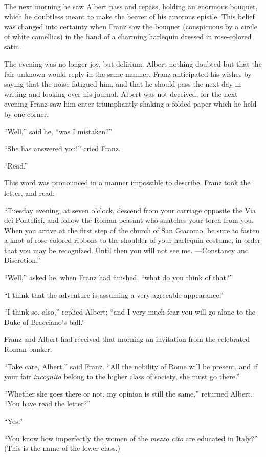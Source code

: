 The next morning he saw Albert pass and repass, holding an enormous
bouquet, which he doubtless meant to make the bearer of his amorous
epistle. This belief was changed into certainty when Franz saw the
bouquet (conspicuous by a circle of white camellias) in the hand of a
charming harlequin dressed in rose-colored satin.

The evening was no longer joy, but delirium. Albert nothing doubted but
that the fair unknown would reply in the same manner. Franz anticipated
his wishes by saying that the noise fatigued him, and that he should
pass the next day in writing and looking over his journal. Albert was
not deceived, for the next evening Franz saw him enter triumphantly
shaking a folded paper which he held by one corner.

“Well,” said he, “was I mistaken?”

“She has answered you!” cried Franz.

“Read.”

This word was pronounced in a manner impossible to describe. Franz took
the letter, and read:

“Tuesday evening, at seven o’clock, descend from your carriage opposite
the Via dei Pontefici, and follow the Roman peasant who snatches your
torch from you. When you arrive at the first step of the church of San
Giacomo, be sure to fasten a knot of rose-colored ribbons to the
shoulder of your harlequin costume, in order that you may be
recognized. Until then you will not see me. —Constancy and Discretion.”

“Well,” asked he, when Franz had finished, “what do you think of that?”

“I think that the adventure is assuming a very agreeable appearance.”

“I think so, also,” replied Albert; “and I very much fear you will go
alone to the Duke of Bracciano’s ball.”

Franz and Albert had received that morning an invitation from the
celebrated Roman banker.

“Take care, Albert,” said Franz. “All the nobility of Rome will be
present, and if your fair \textit{incognita} belong to the higher class of
society, she must go there.”

“Whether she goes there or not, my opinion is still the same,” returned
Albert. “You have read the letter?”

“Yes.”

“You know how imperfectly the women of the \textit{mezzo cito} are educated in
Italy?” (This is the name of the lower class.)


